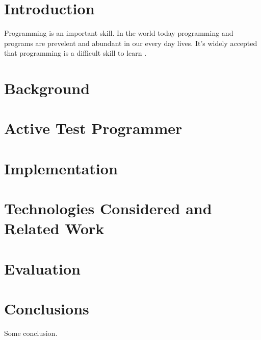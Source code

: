 \documentclass[twocolumn]{article}
\begin{document}


\begin{abstract}

\end{abstract}

\section{Introduction}
Programming is an important skill. In the world today programming and programs
are prevelent and abundant in our every day lives. It's widely accepted that
programming is a difficult skill to learn \cite{jenkins2002difficulty,
bennedsen2007failure, robins2003learning}.

\section{Background}

\section{Active Test Programmer}

\section{Implementation}

\section{Technologies Considered and Related Work}

\section{Evaluation}

\section{Conclusions}
Some conclusion.



\end{document}
